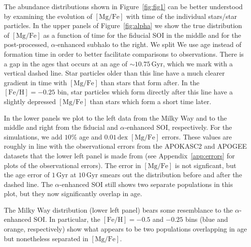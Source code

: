 \documentclass[linenumbers, twocolumn]{aastex631}
\newcommand{\Gyr}{\ensuremath{\textrm{Gyr}}}
\newcommand{\FeH}{\ensuremath{[\textrm{Fe}/\textrm{H}]}}
\newcommand{\MgFe}{\ensuremath{[\textrm{Mg}/\textrm{Fe}]}}
\newcommand{\dex}{\ensuremath{\textrm{dex}}}
\begin{document}
The abundance distributions shown in Figure~\ref{fig:fig1} can be better understood by examining the evolution of \MgFe{} with time of the individual stars/star particles. In the upper panels of Figure~\ref{fig:alpha} we show the true distribution of \MgFe{} as a function of time for the fiducial SOI in the middle and for the post-processed, $\alpha$-enhanced subhalo to the right. We split  We use age instead of formation time in order to better facilitate comparisons to observations. There is a gap in the ages that occurs at an age of  $\sim10.75\,\Gyr$, which we mark with a vertical dashed line. Star particles older than this line have a much clearer gradient in time with \MgFe{} than stars that form after. In the $\FeH=-0.25$ bin, star particles which form directly after this line have a slightly depressed \MgFe{} than stars which form a short time later.

In the lower panels we plot to the left data from the Milky Way and to the middle and right from the fiducial and $\alpha$-enhanced SOI, respectively. For the simulations, we add $10\%$ age and $0.01\,\dex$ \MgFe{} errors. These values are roughly in line with the observational errors from the APOKASC2 and APOGEE datasets that the lower left panel is made from (see Appendix~\ref{app:errors} for plots of the observational errors). The error in \MgFe{} is not signficant, but the age error of $1\,\Gyr$ at $10\,\Gyr$ smears out the distribution before and after the dashed line. The $\alpha$-enhanced SOI still shows two separate populations in this plot, but they now significantly overlap in age.

The Milky Way distribution (lower left panel) bears some resemblance to the $\alpha$-enhanced SOI. In particular, the $\FeH=-0.5$ and $-0.25$ bins (blue and orange, respectively) show what appears to be two populations overlapping in age but nonetheless separated in \MgFe{}.
\end{document}
